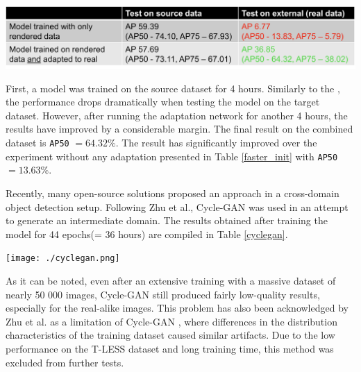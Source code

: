 \documentclass[english, 12pt, a4paper, elec, utf8, a-1b, online]{aaltothesis}
\begin{document}
\begin{table}[htb]
	\begin{center}
		\includegraphics[width=14cm]{./dadapt.png}
	\end{center}
	\begin{center}
		\label{dadapt}
	\end{center}
\end{table}
\FloatBarrier

First, a model was trained on the source dataset for 4 hours. Similarly to the , the performance drops dramatically when testing the model on the target dataset. However, after running the adaptation network for another 4 hours, the results have improved by a considerable margin. The final result on the combined dataset is \texttt{AP50} $= 64.32\%$. The result has significantly improved over the experiment without any adaptation presented in Table \ref{faster_init} with \texttt{AP50} $= 13.63\%$. 

Recently, many open-source solutions proposed \cite{Inoue_2018_CVPR, Chen2020, Arruda2019} an  approach in a cross-domain object detection setup. Following Zhu et al., Cycle-GAN \cite{Zhu2017} was used in an attempt to generate an intermediate domain. The results obtained after training the model for 44 epochs(= 36 hours) are compiled in Table \ref{cyclegan}.  

\begin{table}[htb]
	\begin{center}
		\texttt{[image: ./cyclegan.png]}
	\end{center}
	\begin{center}
		\label{cyclegan}
	\end{center}
\end{table}
\FloatBarrier

As it can be noted, even after an extensive training with a massive dataset of nearly 50 000 images, Cycle-GAN still produced fairly low-quality results, especially for the real-alike images. This problem has also been acknowledged by Zhu et al. as a limitation of Cycle-GAN \cite{Zhu2017}, where differences in the distribution characteristics of the training dataset caused similar artifacts. Due to the low performance on the T-LESS dataset and long training time, this method was excluded from further tests. 
\end{document}
